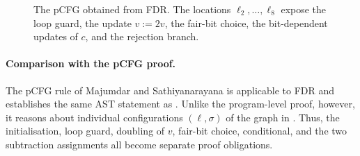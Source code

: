 \begin{figure}[t]

    \vspace{-1mm}
    \caption{The pCFG obtained from FDR. The locations
    $\ell_2,\ldots,\ell_8$ expose the loop guard, the update $v:=2v$, the
    fair-bit choice, the bit-dependent updates of $c$, and the rejection
    branch.}
    \label{fig:fdr-pcfg}
\end{figure}


\paragraph{Comparison with the pCFG proof.}
The pCFG rule of Majumdar and Sathiyanarayana is applicable to FDR and
establishes the same AST statement as .  Unlike the
program-level proof, however, it reasons about individual configurations
$(\ell,\sigma)$ of the graph in .  Thus, the initialisation,
loop guard, doubling of $v$, fair-bit choice, conditional, and the two
subtraction assignments all become separate proof obligations.

